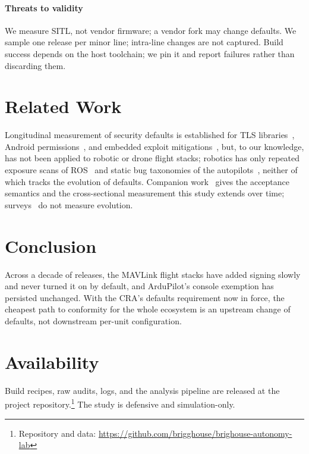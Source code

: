 \documentclass[conference]{IEEEtran}
\begin{document}
\paragraph{Threats to validity} We measure SITL, not vendor firmware; a vendor
fork may change defaults. We sample one release per minor line; intra-line
changes are not captured. Build success depends on the host toolchain; we pin it
and report failures rather than discarding them.

\section{Related Work}
Longitudinal measurement of security defaults is established for TLS
libraries~\cite{kotzias2018tls,walden2020openssl}, Android
permissions~\cite{wei2012permission}, and embedded exploit
mitigations~\cite{yu2022embedded1996}, but, to our knowledge, has not been
applied to robotic or drone flight stacks; robotics has only repeated exposure
scans of ROS~\cite{demarinis2019ros,chen2024rosvehicles} and static bug
taxonomies of the autopilots~\cite{wang2021autopilotbugs,taylor2021uasbugs},
neither of which tracks the evolution of defaults. Companion work~\cite{brighouse2026signing} gives the
acceptance semantics and the cross-sectional measurement this study extends over
time; surveys~\cite{hamza2024} do not measure evolution.

\section{Conclusion}
Across a decade of releases, the MAVLink flight stacks have added signing slowly
and never turned it on by default, and ArduPilot's console exemption has
persisted unchanged. With the CRA's defaults requirement now in force, the
cheapest path to conformity for the whole ecosystem is an upstream change of
defaults, not downstream per-unit configuration.

\section*{Availability}
Build recipes, raw audits, logs, and the analysis pipeline are released at the
project repository.\footnote{Repository and data: \url{https://github.com/brigghouse/brighouse-autonomy-lab}} The study is defensive and simulation-only.



\end{document}
